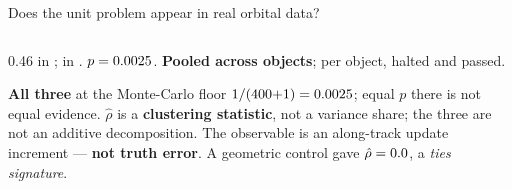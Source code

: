 \documentclass[aspectratio=169,11pt]{beamer}
\begin{document}
\begin{frame}{Does the unit problem appear in real orbital data?}
\begin{columns}[T,onlytextwidth]
\begin{column}{0.46\textwidth}
      \vspace{0.3em}
      {\scriptsize \Natused{} in \Natgroups{}; \Natelsetunits{} in \Natelsetgroups{}.
       $p=0.0025$. \textbf{Pooled across objects}; per object,
       \Nperobjhalt{} halted and \Nperobjpass{} passed.}

      \vspace{0.4em}
      \vspace{0.3em}
      {\scriptsize \textbf{All three} at the Monte-Carlo floor $1/(400{+}1)=0.0025$; equal $p$
      there is not equal evidence. $\hat{\rho}$ is a \textbf{clustering statistic}, not a variance
      share; the three are not an additive decomposition. The observable is an along-track update
      increment --- \textbf{not truth error}. A geometric control gave $\hat{\rho}=0.0$,
      a \emph{ties signature}.}
    \end{column}
  \end{columns}
\end{frame}
\end{document}
